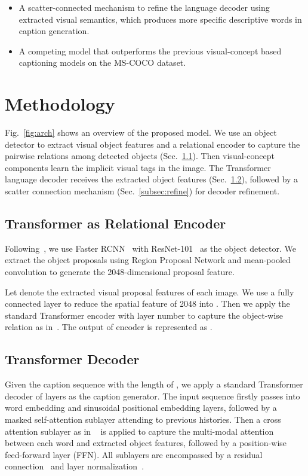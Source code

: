 \documentclass[11pt]{article}
\begin{document}
\begin{itemize} [noitemsep]
    \item A scatter-connected mechanism to refine the language decoder using extracted visual semantics, which produces more specific descriptive words in caption generation.
    \item A competing model that outperforms the previous visual-concept based captioning models on the MS-COCO dataset.
\end{itemize}




\section{Methodology}
\label{sec:method}
Fig.~\ref{fig:arch} shows an overview of the proposed model. We use an object detector to extract visual object features and a relational encoder to capture the pairwise relations among detected objects (Sec.~\ref{subsec:enc}). Then visual-concept components learn the implicit visual tags in the image. The Transformer language decoder receives the extracted object features (Sec.~\ref{subsec:dec}), followed by a scatter connection mechanism (Sec.~\ref{subsec:refine}) for decoder refinement.


\subsection{Transformer as Relational Encoder}
\label{subsec:enc}
Following~\citep{anderson2018bottom}, we use Faster RCNN~\cite{ren2015faster} with ResNet-101~\cite{he2016deep} as the object detector. We extract the object proposals using Region Proposal Network and mean-pooled convolution to generate the 2048-dimensional proposal feature. 

Let  denote the extracted  visual proposal features of each image. We use a fully connected layer to reduce the spatial feature of 2048 into . Then we apply the standard Transformer encoder with layer number  to capture the object-wise relation as in~\cite{zambaldi2018deep}. The output of encoder is represented as . 


\subsection{Transformer Decoder}
\label{subsec:dec}
Given the caption sequence with the length of , we apply a standard Transformer decoder of  layers as the caption generator. The input sequence firstly passes into word embedding and sinusoidal positional embedding layers, followed by a masked self-attention sublayer attending to previous histories. Then a cross attention sublayer as in ~\citet{vaswani2017attention} is applied to capture the multi-modal attention between each word and extracted object features, followed by a position-wise feed-forward layer (FFN). All sublayers are encompassed by a residual connection~\citep{he2016deep} and layer normalization~\citep{ba2016layer}.
\end{document}
